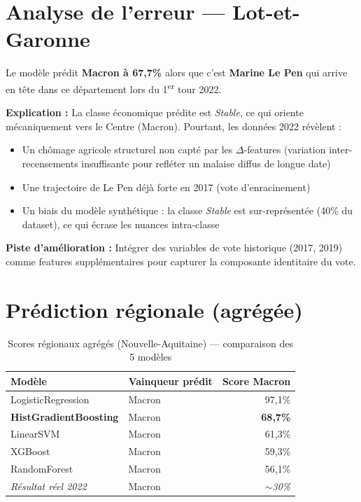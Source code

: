 \section{Analyse de l'erreur — Lot-et-Garonne}

\begin{warnbox}
Le modèle prédit \textbf{Macron à 67,7\%} alors que c'est \textbf{Marine Le Pen} qui
arrive en tête dans ce département lors du 1\textsuperscript{er} tour 2022.

\textbf{Explication :} La classe économique prédite est \textit{Stable}, ce qui oriente
mécaniquement vers le Centre (Macron). Pourtant, les données 2022 révèlent :
\begin{itemize}
  \item Un chômage agricole structurel non capté par les $\Delta$-features (variation inter-
    recensements insuffisante pour refléter un malaise diffus de longue date)
  \item Une trajectoire de Le Pen déjà forte en 2017 (vote d'enracinement)
  \item Un biais du modèle synthétique : la classe \textit{Stable} est sur-représentée
    (40\% du dataset), ce qui écrase les nuances intra-classe
\end{itemize}

\textbf{Piste d'amélioration :} Intégrer des variables de vote historique (2017, 2019)
comme features supplémentaires pour capturer la composante identitaire du vote.
\end{warnbox}

\section{Prédiction régionale (agrégée)}

\begin{table}[H]
\centering
\caption{Scores régionaux agrégés (Nouvelle-Aquitaine) — comparaison des 5 modèles}
\label{tab:regional}
\begin{tabular}{llr}
\toprule
\textbf{Modèle} & \textbf{Vainqueur prédit} & \textbf{Score Macron} \\
\midrule
LogisticRegression          & Macron & 97,1\% \\
\rowcolor{green!15}
\textbf{HistGradientBoosting} & Macron & \textbf{68,7\%} \\
LinearSVM                   & Macron & 61,3\% \\
XGBoost                     & Macron & 59,3\% \\
RandomForest                & Macron & 56,1\% \\
\midrule
\textit{Résultat réel 2022} & Macron & \textit{$\sim$30\%} \\
\bottomrule
\end{tabular}
\end{table}

